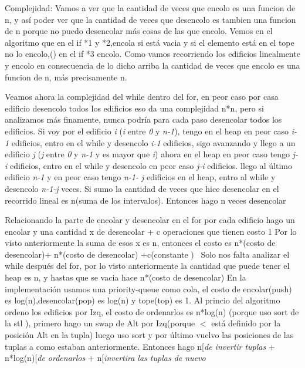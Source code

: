 \documentclass{article}
\begin{document}
\newpage

{\noindent \Huge Complejidad:}
\newline \newline
Vamos a ver que la cantidad de veces que encolo es una funcion de n, y así poder ver que la cantidad de veces que desencolo es tambien una funcion de n porque no puedo desencolar más cosas de las que encolo.
Vemos en el algoritmo que en el if *1 y *2,encola si está vacia y si el elemento está en el tope no lo encolo,(\color{red}{falta demostrar que si quiero encolar un elemento 2 veces el que quiero encolar de nuevo está en el tope, la idea la había sacado angel})\color{black} en el if *3 encolo.
\newline
Como vamos recorriendo los edificios linealmente y encolo en consecuencia de lo dicho arriba la cantidad de veces que encolo es una funcion de n, más precisamente n.

Veamos ahora la complejidad del while dentro del for, en peor caso por casa edificio desencolo todos los edificios eso da una complejidad n*n, pero si analizamos más finamente, nunca podría para cada paso desencolar todos los edificios.\newline
Si voy por el edificio \textit{i} (\textit{i} entre \textit{0} y \textit{n-1}), tengo en el heap en peor caso \textit{i-1} edificios, entro en el while y desencolo \textit{i-1} edificios, sigo avanzando y llego a un edificio \textit{j} (\textit{j} entre \textit{0} y \textit{n-1} y es mayor que \textit{i}) ahora en el heap en peor caso tengo \textit{j-i} edificios, entro en el while y desencolo en peor caso \textit{j-i} edificios.
llego al último edificio \textit{n-1} y en peor caso tengo \textit{n-1- j} edificios en el heap, entro al while y desencolo \textit{n-1-j} veces.
Si sumo la cantidad de veces que hice desencolar en el recorrido lineal es n(suma de los intervalos).
Entonces hago n veces desencolar

Relacionando la parte de encolar y desencolar en el for
por cada edificio hago un encolar y una cantidad x de desencolar + c operaciones que tienen costo 1
Por lo visto anteriormente la suma de esos x es n, entonces el costo es  n*(costo de desencolar)+ n*(costo de desencolar) +c(constante \color{red}{**})\color{black}
\newline\
Solo nos falta analizar el while después del for, por lo visto anteriormente la cantidad que puede tener el heap es n, y hastas que se vacia hace n*(costo de desencolar)
En la implementación usamos una priority-queue como cola, el costo de encolar(push) es log(n),desencolar(pop) es log(n) y tope(top) es 1.
\newline
Al princio del algoritmo ordeno los edificios por Izq, el costo de ordenarlos es n*log(n) (porque uso sort de la stl \color{red}{según este link} \color{black}), primero hago un swap de Alt por Izq(porque $<$ está definido por la posición Alt en la tupla) luego uso sort y por último vuelvo las posiciones de las tuplas a como estaban anteriormente.\newline
Entonces hago n[\textit{de invertir tuplas} + n*log(n)[\textit{de ordenarlos} + n[\textit{invertira las tuplas de nuevo} 
\end{document}
